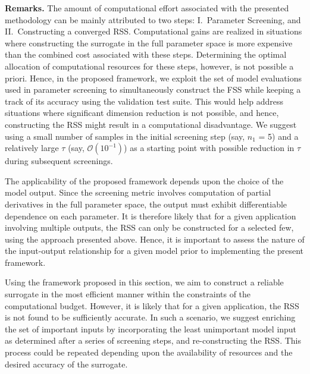 \textbf{Remarks.}
The amount of computational effort associated with the presented methodology
can be mainly attributed to two steps: I.~Parameter Screening, and 
II.~Constructing a converged RSS. Computational gains are realized in situations
where constructing the surrogate in the full parameter space is more expensive
than the combined cost associated with these steps. Determining the optimal
allocation of computational resources for these steps, however, is not possible
a priori. Hence, in the proposed framework, we exploit the set of model
evaluations used in parameter screening to simultaneously construct the FSS
while keeping a track of its accuracy using the validation test suite. This
would help address situations where significant dimension reduction is not
possible, and hence, constructing the RSS might result in a computational
disadvantage. We suggest using a small number of samples in the initial
screening step (say, $n_1$ = 5) and a relatively large $\tau$ (say,
$\mathcal{O}(10^{-1})$) as a starting point with possible reduction in $\tau$
during subsequent screenings. 


The applicability of the proposed framework depends upon the choice of the
model output.  Since the screening metric involves computation of partial
derivatives in the full parameter space, the output must exhibit differentiable
dependence on each parameter. It is therefore likely that for a given
application involving multiple outputs, the RSS can only be constructed for a
selected few, using the approach presented above.  Hence, it is important to
assess the nature of the input-output relationship for a given model prior to
implementing the present framework.

Using the framework proposed in this section, we aim to construct a reliable
surrogate in the most efficient manner within the constraints of the computational
budget. However, it is likely that for a given application, the RSS is not
found to be sufficiently accurate. In such a scenario, we suggest enriching the
set of important inputs by incorporating the least unimportant model input
as determined after a series of screening steps, and re-constructing the RSS. 
This process could be repeated depending upon the availability of resources
and the desired accuracy of the surrogate.  



